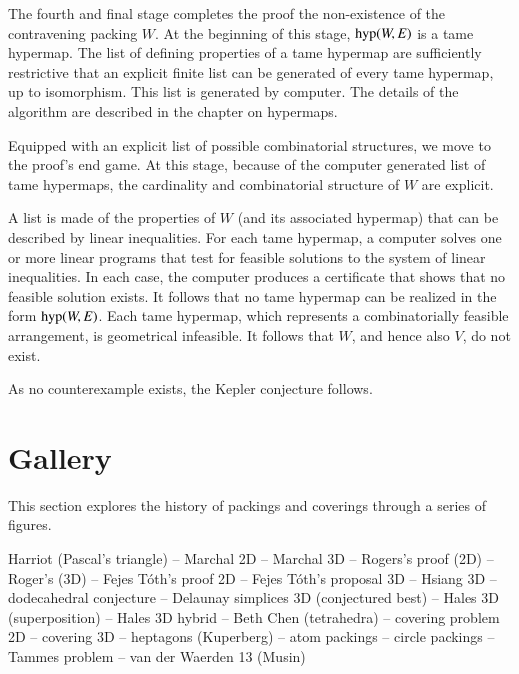 The fourth and final stage completes the proof the non-existence of
the contravening packing $W$.  At the beginning of this stage,
${\operatorname{hyp}}(W,E)$ is a tame hypermap.  The list of defining properties
of a tame hypermap are sufficiently restrictive that an explicit finite
list can be generated of every tame hypermap, up to isomorphism.  
This list is generated by computer.  The details of the algorithm are
described in the chapter on hypermaps.

Equipped with an explicit list of possible combinatorial structures,
we move to the proof's end game.  At this stage, because of the computer
generated list of tame hypermaps, the cardinality and
combinatorial structure of $W$ are explicit.

A list is made of the properties of $W$ (and its associated hypermap)
that can be described by linear inequalities.  For each tame hypermap,
a computer solves one or more linear programs that test for feasible
solutions to the system of linear inequalities.  In each case, the
computer produces a certificate that shows that no feasible solution
exists.  It follows that no tame hypermap can be realized in the form
${\operatorname{hyp}}(W,E)$.  Each tame hypermap, which represents a
combinatorially feasible arrangement, is geometrical infeasible.  It
follows that $W$, and hence also $V$, do not exist.

As no counterexample exists, the Kepler conjecture follows.

\section{Gallery}

This section explores the history of packings and coverings through a
series of figures.

Harriot (Pascal's triangle) -- Marchal 2D -- Marchal 3D -- Rogers's
proof (2D) -- Roger's (3D) -- Fejes T\'oth's proof 2D -- Fejes
T\'oth's proposal 3D -- Hsiang 3D -- dodecahedral conjecture --
Delaunay simplices 3D (conjectured best) -- Hales 3D (superposition)
-- Hales 3D hybrid -- Beth Chen (tetrahedra) -- covering problem 2D --
covering 3D -- heptagons (Kuperberg) -- atom packings -- circle
packings -- Tammes problem -- van der Waerden 13 (Musin)
